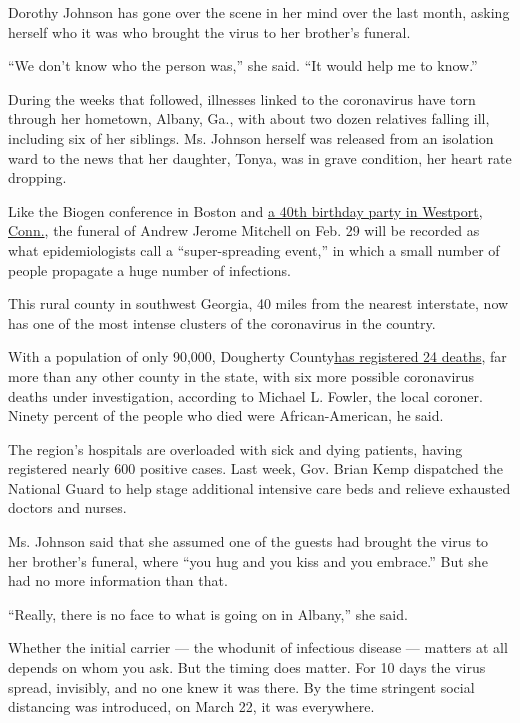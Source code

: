 Dorothy Johnson has gone over the scene in her mind over the last month,
asking herself who it was who brought the virus to her brother's
funeral.

``We don't know who the person was,'' she said. ``It would help me to
know.''

During the weeks that followed, illnesses linked to the coronavirus have
torn through her hometown, Albany, Ga., with about two dozen relatives
falling ill, including six of her siblings. Ms. Johnson herself was
released from an isolation ward to the news that her daughter, Tonya,
was in grave condition, her heart rate dropping.

Like the Biogen conference in Boston and
\href{https://www.nytimes.com/2020/03/23/us/coronavirus-westport-connecticut-party-zero.html}{a
40th birthday party in Westport, Conn.}, the funeral of Andrew Jerome
Mitchell on Feb. 29 will be recorded as what epidemiologists call a
``super-spreading event,'' in which a small number of people propagate a
huge number of infections.

This rural county in southwest Georgia, 40 miles from the nearest
interstate, now has one of the most intense clusters of the coronavirus
in the country.

With a population of only 90,000, Dougherty
County\href{http://www.southwestgeorgiapublichealth.org/?fbclid=IwAR11j4IASewgcRU4ogqaQecmBtM0HgsDwLIXnthrf9NMJzt1Q7MxOvyawgg}{has
registered 24 deaths}, far more than any other county in the state, with
six more possible coronavirus deaths under investigation, according to
Michael L. Fowler, the local coroner. Ninety percent of the people who
died were African-American, he said.

The region's hospitals are overloaded with sick and dying patients,
having registered nearly 600 positive cases. Last week, Gov. Brian Kemp
dispatched the National Guard to help stage additional intensive care
beds and relieve exhausted doctors and nurses.

Ms. Johnson said that she assumed one of the guests had brought the
virus to her brother's funeral, where ``you hug and you kiss and you
embrace.'' But she had no more information than that.

``Really, there is no face to what is going on in Albany,'' she said.

Whether the initial carrier --- the whodunit of infectious disease ---
matters at all depends on whom you ask. But the timing does matter. For
10 days the virus spread, invisibly, and no one knew it was there. By
the time stringent social distancing was introduced, on March 22, it was
everywhere.


